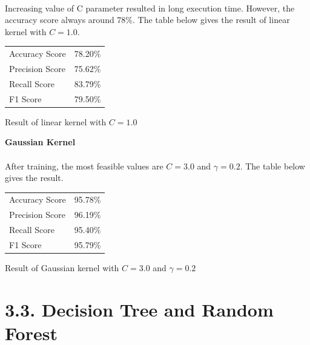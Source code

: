 \documentclass[a4paper]{report}
\begin{document}
	\paragraph{}
	Increasing value of C parameter resulted in long execution time. However, the accuracy score always around 78\%. The table below gives the result of linear kernel with $C = 1.0$.\\
	
	\begin{center}
		\begin{tabular}{ll}
			\toprule
			Accuracy Score & 78.20\% \\
			Precision Score & 75.62\% \\
			Recall Score & 83.79\% \\
			F1 Score & 79.50\% \\
			\bottomrule
		\end{tabular}
	\end{center}
	\begin{center}
		Result of linear kernel with $C = 1.0$
	\end{center}
	
	\textbf{\Large Gaussian Kernel}
	\paragraph{}
	After training, the most feasible values are $C = 3.0$ and $\gamma = 0.2$. The table below gives the result.
	
	\begin{center}
		\begin{tabular}{ll}
			\toprule
			Accuracy Score & 95.78\% \\
			Precision Score & 96.19\% \\
			Recall Score & 95.40\% \\
			F1 Score & 95.79\% \\
			\bottomrule
		\end{tabular}
	\end{center}
	
	\begin{center}
		Result of Gaussian kernel with $C = 3.0$ and $\gamma = 0.2$
	\end{center}
	
	
	
	
	\section*{\Large 3.3. Decision Tree and Random Forest} \Large
	
\end{document}
